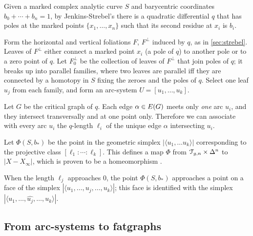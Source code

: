Given a marked complex analytic curve $S$ and barycentric coordinates
$b_0 + \cdots + b_n = 1$, by Jenkins-Strebel's  there is a
quadratic differential $q$ that has poles at the marked points $\{ x_1,
\ldots, x_n \}$ such that its second residue at $x_i$ is $b_i$.

Form the horizontal and vertical foliations $F$, $F^\perp$ induced by $q$,
as in \ref{sec:strebel}.  Leaves of $F^\perp$ either connect a marked
point $x_i$ (a pole of $q$) to another pole or to a zero point of $q$.
Let $F^\perp_0$ be the collection of leaves of $F^\perp$ that join poles of
$q$; it breaks up into parallel families, where two leaves are
parallel iff they are connected by a homotopy in $S$ fixing the zeroes
and the poles of $q$.  Select one leaf $u_j$ from each family, and
form an arc-system $U = [u_1, \ldots, u_k]$.

Let $G$ be the critical graph of $q$.  Each edge $\alpha \in E(G)$ meets
only \emph{one} arc $u_i$, and they intersect transversally and at one
point only.  Therefore we can associate with every arc $u_i$ the
$q$-length $\ell_i$ of the unique edge $\alpha$ intersecting $u_i$.  

Let $\Phi(S, b_*)$ be the point in the geometric simplex $|\langle u_1, \ldots
u_k\rangle|$ corresponding to the projective class $[\ell_1:\cdots:\ell_k]$.  This
defines a map $\Phi$ from $\mathcal{T}_{g,n} \times \Delta^n$ to $|X - X_\infty|$, which is
proven to be a homeomorphism \cite{harer;cohomological-dimension,
  looijenga;cellular-decomposition}.

\begin{remark}
  \label{rem:approaching-face}
  When the length $\ell_j$ approaches $0$, the point $\Phi(S, b_*)$
  approaches a point on a face of the simplex $|\langle u_1, \ldots,
  u_j, \ldots, u_k\rangle|$; this face is identified with the simplex
  $|\langle u_1, \ldots, \widehat{u_j}, \ldots, u_k\rangle|$.
\end{remark}


\subsection{From arc-systems to fatgraphs}
\label{sec:arcs-to-rg}

